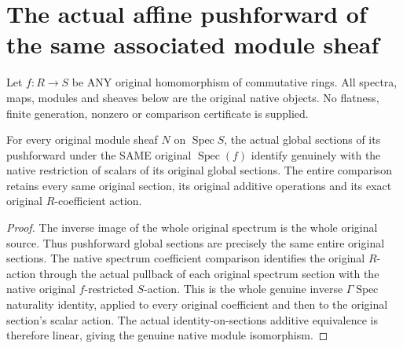 \section{The actual affine pushforward of the same associated module sheaf}
\label{sec:spec-pushforward-tilde}

Let $f:R\to S$ be ANY original homomorphism of commutative rings.
All spectra, maps, modules and sheaves below are the original native
objects. No flatness, finite generation, nonzero or comparison
certificate is supplied.

\begin{theorem}
\label{lem:cartier-spec-pushforward-sections}
\leanok
For every original module sheaf $N$ on $\operatorname{Spec}S$, the
actual global sections of its pushforward under the SAME original
$\operatorname{Spec}(f)$ identify genuinely with the native restriction
of scalars of its original global sections. The entire comparison
retains every same original section, its original additive operations
and its exact original $R$-coefficient action.
\end{theorem}
\begin{proof}
The inverse image of the whole original spectrum is the whole
original source. Thus pushforward global sections are precisely
the same entire original sections. The native spectrum coefficient
comparison identifies the original $R$-action through the actual
pullback of each original spectrum section with the native original
$f$-restricted $S$-action. This is the whole genuine inverse
$\Gamma\operatorname{Spec}$ naturality identity, applied to every
original coefficient and then to the original section's scalar
action. The actual identity-on-sections additive equivalence is
therefore linear, giving the genuine native module isomorphism.
\end{proof}

